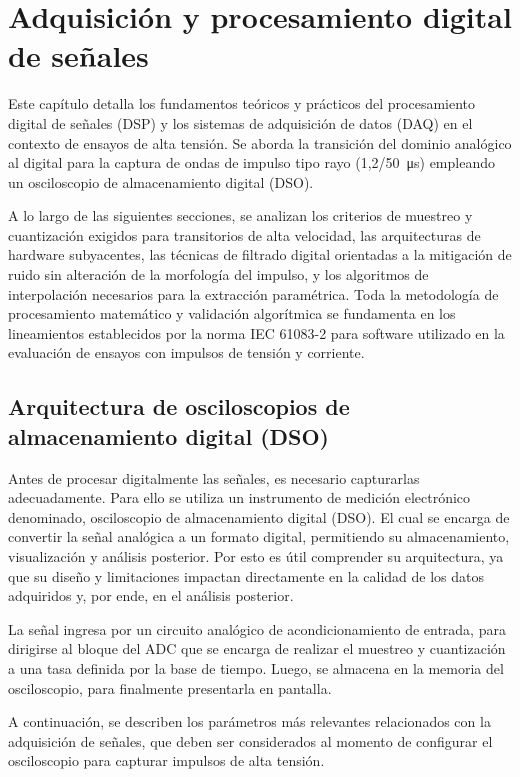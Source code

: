 \newpage
\chapter{Adquisición y procesamiento digital de señales}
\vspace{3\baselineskip}

Este capítulo detalla los fundamentos teóricos y prácticos del procesamiento digital de señales (DSP) y los sistemas de adquisición de datos (DAQ) en el contexto de ensayos de alta tensión. Se aborda la transición del dominio analógico al digital para la captura de ondas de impulso tipo rayo (\SI[parse-numbers=false]{1,2/50}{\micro\second}) empleando un osciloscopio de almacenamiento digital (DSO).\par
A lo largo de las siguientes secciones, se analizan los criterios de muestreo y cuantización exigidos para transitorios de alta velocidad, las arquitecturas de hardware subyacentes, las técnicas de filtrado digital orientadas a la mitigación de ruido sin alteración de la morfología del impulso, y los algoritmos de interpolación necesarios para la extracción paramétrica. Toda la metodología de procesamiento matemático y validación algorítmica se fundamenta en los lineamientos establecidos por la norma IEC 61083-2 para software utilizado en la evaluación de ensayos con impulsos de tensión y corriente.\par

\section{Arquitectura de osciloscopios de almacenamiento digital (DSO)}

Antes de procesar digitalmente las señales, es necesario capturarlas adecuadamente. Para ello se utiliza un instrumento de medición electrónico denominado, osciloscopio de almacenamiento digital (DSO). 
El cual se encarga de convertir la señal analógica a un formato digital, permitiendo su almacenamiento, visualización y análisis posterior. Por esto es útil comprender su arquitectura, ya que su diseño y limitaciones impactan directamente en la calidad de los datos adquiridos y, por ende, en el análisis posterior.\par
La señal ingresa por un circuito analógico de acondicionamiento de entrada, para dirigirse al bloque del ADC que se encarga de realizar el muestreo y cuantización a una tasa definida por la base de tiempo. Luego, se almacena en la memoria del osciloscopio, para finalmente presentarla en pantalla.\par
A continuación, se describen los parámetros más relevantes relacionados con la adquisición de señales, que deben ser considerados al momento de configurar el osciloscopio para capturar impulsos de alta tensión.

